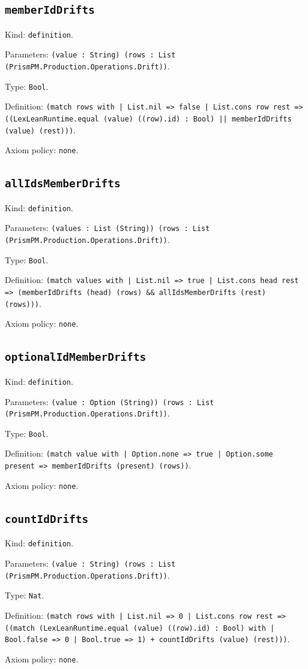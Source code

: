 \documentclass[11pt]{article}
\begin{document}
\subsection*{\texttt{memberIdDrifts}}
\noindent Kind: \texttt{definition}.\par
\noindent Parameters: \texttt{(value : String) (rows : List (PrismPM.Production.Operations.Drift))}.\par
\noindent Type: \texttt{Bool}.\par
\noindent Definition: \texttt{(match rows with | List.nil => false | List.cons row rest => ((LexLeanRuntime.equal (value) ((row).id) : Bool) || memberIdDrifts (value) (rest)))}.\par
\noindent Axiom policy: \texttt{none}.\par
\subsection*{\texttt{allIdsMemberDrifts}}
\noindent Kind: \texttt{definition}.\par
\noindent Parameters: \texttt{(values : List (String)) (rows : List (PrismPM.Production.Operations.Drift))}.\par
\noindent Type: \texttt{Bool}.\par
\noindent Definition: \texttt{(match values with | List.nil => true | List.cons head rest => (memberIdDrifts (head) (rows) \&\& allIdsMemberDrifts (rest) (rows)))}.\par
\noindent Axiom policy: \texttt{none}.\par
\subsection*{\texttt{optionalIdMemberDrifts}}
\noindent Kind: \texttt{definition}.\par
\noindent Parameters: \texttt{(value : Option (String)) (rows : List (PrismPM.Production.Operations.Drift))}.\par
\noindent Type: \texttt{Bool}.\par
\noindent Definition: \texttt{(match value with | Option.none => true | Option.some present => memberIdDrifts (present) (rows))}.\par
\noindent Axiom policy: \texttt{none}.\par
\subsection*{\texttt{countIdDrifts}}
\noindent Kind: \texttt{definition}.\par
\noindent Parameters: \texttt{(value : String) (rows : List (PrismPM.Production.Operations.Drift))}.\par
\noindent Type: \texttt{Nat}.\par
\noindent Definition: \texttt{(match rows with | List.nil => 0 | List.cons row rest => ((match (LexLeanRuntime.equal (value) ((row).id) : Bool) with | Bool.false => 0 | Bool.true => 1) + countIdDrifts (value) (rest)))}.\par
\noindent Axiom policy: \texttt{none}.\par
\end{document}

